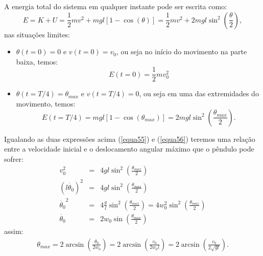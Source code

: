 \documentclass[12pt,openright,twoside,english,brazil]{abntex2}
\begin{document}
A energia total do sistema em qualquer instante pode ser escrita como:
\begin{equation}
 E = K + U = \frac{1}{2} m v^2 + mgl \left[ 1 - \cos{(\theta)} \right] = \frac{1}{2} m v^2 + 2mgl \sin^2{\left( \frac{\theta}{2} \right)},
 \label{equa54}
\end{equation}
nas situações limites:
\begin{itemize}
 \item $\theta(t=0)=0$ e $v(t=0)=v_0$, ou seja no início do movimento na parte baixa, temos:
       \begin{equation}
        E(t=0) = \frac{1}{2}m v_0^2 
        \label{equa55}
       \end{equation}
 \item $\theta(t=T/4)=\theta_{max}$ e $v(t=T/4)=0$, ou seja em uma das extremidades do movimento, temos:
       \begin{equation}
        E(t=T/4) = mgl \left[ 1 - \cos{(\theta_{max})} \right] = 2 mgl \sin^2{\left( \frac{\theta_{max}}{2} \right) }.
        \label{equa56}
       \end{equation}
\end{itemize}

Igualando as duas expressões acima (\ref{equa55}) e (\ref{equa56}) teremos uma relação entre a velocidade inicial e o deslocamento angular máximo que o pêndulo pode sofrer:
\begin{eqnarray}
 v_0^2 & = & 4gl \sin^2{\left( \frac{\theta_{max}}{2} \right)} \nonumber \\
 \left( l \dot{\theta_0}\right)^2 & = & 4gl \sin^2{\left( \frac{\theta_{max}}{2} \right)} \nonumber \\
 \dot{\theta_0}^2 & = & 4 \frac{g}{l} \sin^2{\left( \frac{\theta_{max}}{2} \right)} = 4 w_0^2 \sin^2{\left( \frac{\theta_{max}}{2} \right)} \nonumber \\
 \dot{\theta_0} & = & 2w_0 \sin{\left( \frac{\theta_{max}}{2} \right)} \nonumber
\end{eqnarray}
assim:
\begin{eqnarray}
 \boxed{\theta_{max} = 2 \arcsin{\left( \frac{\dot{\theta_0}}{2w_0} \right)} = 2 \arcsin{\left( \frac{v_0}{2w_0 l} \right)} = 2 \arcsin{\left( \frac{v_0}{2\sqrt{gl}}\right)}}.
 \label{equa57}
\end{eqnarray}
\end{document}
